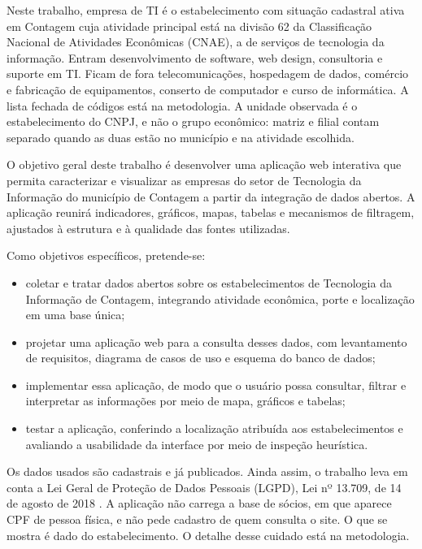Neste trabalho, empresa de TI é o estabelecimento com situação cadastral ativa em Contagem cuja atividade principal está na divisão 62 da Classificação Nacional de Atividades Econômicas (CNAE), a de serviços de tecnologia da informação.
Entram desenvolvimento de software, web design, consultoria e suporte em TI.
Ficam de fora telecomunicações, hospedagem de dados, comércio e fabricação de equipamentos, conserto de computador e curso de informática.
A lista fechada de códigos está na metodologia.
A unidade observada é o estabelecimento do CNPJ, e não o grupo econômico: matriz e filial contam separado quando as duas estão no município e na atividade escolhida.

O objetivo geral deste trabalho é desenvolver uma aplicação web interativa que permita caracterizar e visualizar as empresas do setor de Tecnologia da Informação do município de Contagem a partir da integração de dados abertos.
A aplicação reunirá indicadores, gráficos, mapas, tabelas e mecanismos de filtragem, ajustados à estrutura e à qualidade das fontes utilizadas.

Como objetivos específicos, pretende-se:

\begin{itemize}
    \item coletar e tratar dados abertos sobre os estabelecimentos de Tecnologia da Informação de Contagem, integrando atividade econômica, porte e localização em uma base única;
    \item projetar uma aplicação web para a consulta desses dados, com levantamento de requisitos, diagrama de casos de uso e esquema do banco de dados;
    \item implementar essa aplicação, de modo que o usuário possa consultar, filtrar e interpretar as informações por meio de mapa, gráficos e tabelas;
    \item testar a aplicação, conferindo a localização atribuída aos estabelecimentos e avaliando a usabilidade da interface por meio de inspeção heurística.
\end{itemize}

Os dados usados são cadastrais e já publicados. Ainda assim, o trabalho leva em conta a Lei Geral de Proteção de Dados Pessoais (LGPD), Lei nº 13.709, de 14 de agosto de 2018 \cite{brasil2018}.
A aplicação não carrega a base de sócios, em que aparece CPF de pessoa física, e não pede cadastro de quem consulta o site.
O que se mostra é dado do estabelecimento. O detalhe desse cuidado está na metodologia.

